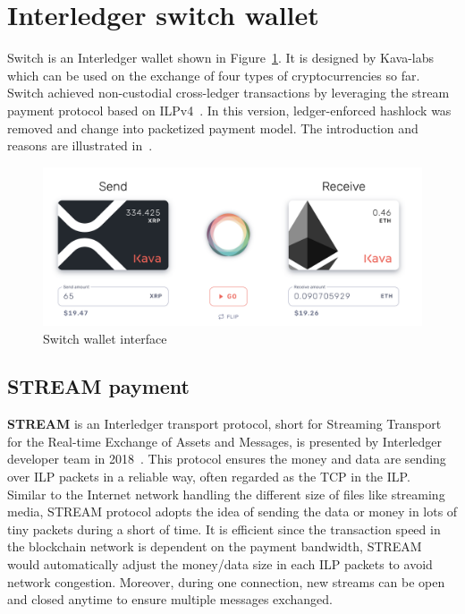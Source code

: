 \section{Interledger switch wallet}
\label{sec:switch}
\noindent Switch is an Interledger wallet shown in Figure~\ref{fig:switch}. It is designed by Kava-labs~\cite{switch} which can be used on the exchange of four types of cryptocurrencies so far. Switch achieved non-custodial cross-ledger transactions by leveraging the stream payment protocol based on ILPv4~\cite{ilpv4}. In this version, ledger-enforced hashlock was removed and change into packetized payment model. The introduction and reasons are illustrated in~.

\begin{figure}[H]
    \includegraphics[width=1\textwidth]{./figures/interface}
        \centering
        \caption{Switch wallet interface}
        \centering
        \label{fig:switch}

\end{figure}
\subsection{STREAM payment}
\label{subsec:stream}
\noindent \textbf{STREAM} is an Interledger transport protocol, short for Streaming Transport for the Real-time Exchange of Assets and Messages, is presented by Interledger developer team in 2018~\cite{stream}. This protocol ensures the money and data are sending over ILP packets in a reliable way, often regarded as the TCP in the ILP. \\

\noindent Similar to the Internet network handling the different size of files like streaming media, STREAM protocol adopts the idea of sending the data or money in lots of tiny packets during a short of time. It is efficient since the transaction speed in the blockchain network is dependent on the payment bandwidth, STREAM would automatically adjust the money/data size in each ILP packets to avoid network congestion. Moreover, during one connection, new streams can be open and closed anytime to ensure multiple messages exchanged.\\

